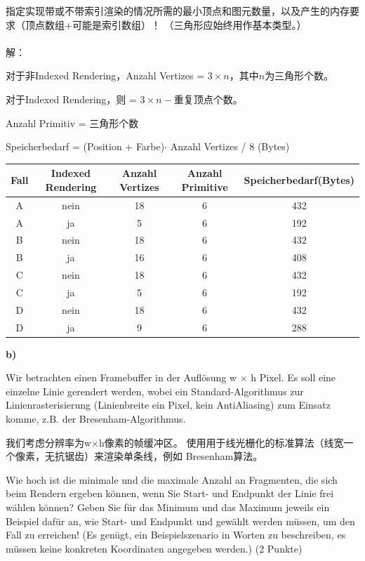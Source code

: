 \documentclass[fleqn]{article}
\begin{document}
指定实现带或不带索引渲染的情况所需的最小顶点和图元数量，以及产生的内存要求（顶点数组+可能是索引数组）！ （三角形应始终用作基本类型。）
\\
\\
解：

对于非Indexed Rendering，Anzahl Vertizes = $3\times n$，其中$n$为三角形个数。

对于Indexed Rendering，则 = $3\times n - $重复顶点个数。

Anzahl Primitiv = 三角形个数

Speicherbedarf = (Position + Farbe)$\cdot$ Anzahl Vertizes / 8 (Bytes)

\begin{center}
    \begin{tabular}{|c|c|c|c|c|}
        \hline
        Fall&Indexed Rendering&Anzahl Vertizes&Anzahl Primitive&Speicherbedarf(Bytes)\\
        \hline
        A&nein&18&6&432\\
        \hline
        A&ja&5&6&192\\
        \hline
        B&nein&18&6&432\\
        \hline
        B&ja&16&6&408\\
        \hline
        C&nein&18&6&432\\
        \hline
        C&ja&5&6&192\\
        \hline
        D&nein&18&6&432\\
        \hline
        D&ja&9&6&288\\
        \hline
    \end{tabular}
\end{center}

\noindent\textbf{b)} 

Wir betrachten einen Framebuffer in der Auflösung w $\times$ h Pixel. Es soll eine einzelne Linie gerendert werden, wobei ein Standard-Algorithmus zur Linienrasterisierung (Linienbreite ein Pixel, kein AntiAliasing) zum Einsatz komme, z.B. der Bresenham-Algorithmus. 

我们考虑分辨率为w$\times$h像素的帧缓冲区。 使用用于线光栅化的标准算法（线宽一个像素，无抗锯齿）来渲染单条线，例如 Bresenham算法。

Wie hoch ist die minimale und die maximale Anzahl an Fragmenten, die sich beim Rendern ergeben können, wenn Sie Start- und Endpunkt der Linie frei wählen können? Geben Sie für das Minimum und das Maximum jeweils ein Beispiel dafür an, wie Start- und Endpunkt und gewählt werden müssen, um den Fall zu erreichen! (Es genügt, ein Beispielszenario in Worten zu beschreiben, es müssen keine konkreten Koordinaten angegeben werden.) (2 Punkte)
\end{document}
